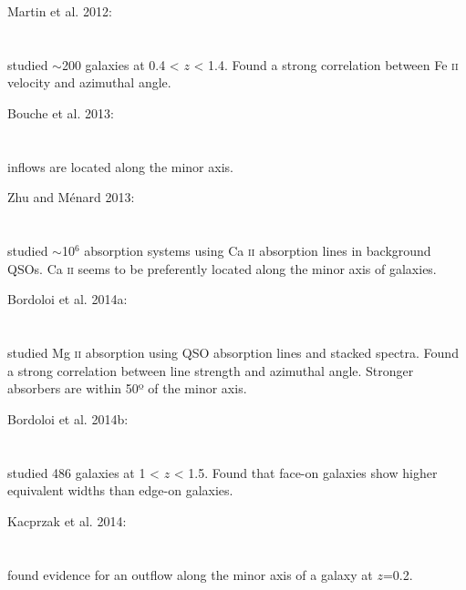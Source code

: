 \hline

Martin et al. 2012: \\
\citet{2012ApJ...760..127M} \\
\citep{2012ApJ...760..127M} \\
studied $\sim$200 galaxies at 0.4 < $z$ < 1.4. Found a strong correlation
between Fe \textsc{ii} velocity and azimuthal angle. \\

\hline

Bouche et al. 2013: \\
\citet{2013Sci...341...50B} \\
\citep{2013Sci...341...50B} \\
inflows are located along the minor axis. \\

\hline

Zhu and Ménard 2013: \\
\citet{2013ApJ...773...16Z} \\
\citep{2013ApJ...773...16Z} \\
studied $\sim$10$^{6}$ absorption systems using Ca \textsc{ii} absorption lines
in background QSOs. Ca \textsc{ii} seems to be preferently located along the
minor axis of galaxies. \\

\hline

Bordoloi et al. 2014a: \\
\citet{2014ApJ...784..108B} \\
\citep{2014ApJ...784..108B} \\
studied Mg \textsc{ii} absorption using QSO absorption lines and stacked
spectra. Found a strong correlation between line strength and azimuthal angle.
Stronger absorbers are within 50º of the minor axis. \\

\hline

Bordoloi et al. 2014b: \\
\citet{2014ApJ...794..130B} \\
\citep{2014ApJ...794..130B} \\
studied 486 galaxies at 1 < $z$ < 1.5. Found that face-on galaxies show higher
equivalent widths than edge-on galaxies. \\

\hline

Kacprzak et al. 2014: \\
\citet{2014ApJ...792L..12K} \\
\citep{2014ApJ...792L..12K} \\
found evidence for an outflow along the minor axis of a galaxy at $z$=0.2. \\

